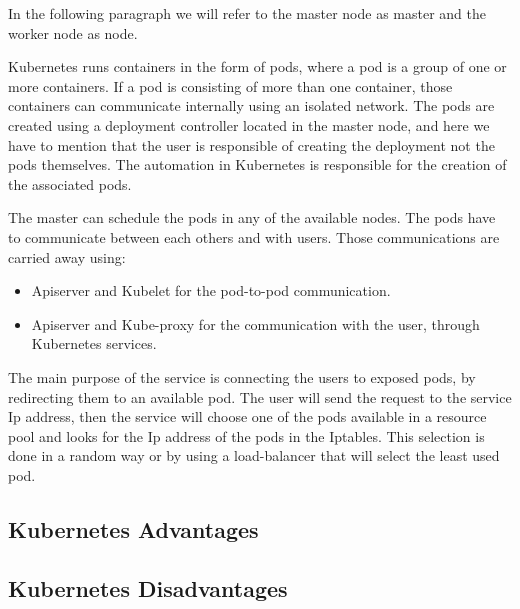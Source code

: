 \documentclass[letterpaper,twocolumn,10pt]{article}
\begin{document}
In the following paragraph we will refer to the master node as master and the worker node as node. 

Kubernetes runs containers in the form of pods, where a pod is a group of one or more containers. If a pod is consisting of more than one container, those containers can communicate internally using an isolated network. The pods are created using a deployment controller located in the master node, and here we have to mention that the user is responsible of creating the deployment not the pods themselves. The automation in Kubernetes is responsible for the creation of the associated pods.

The master can schedule the pods in any of the available nodes. The pods have to communicate between each others and with users. Those communications are carried away using: 

\begin{itemize}
	\item Apiserver and Kubelet for the pod-to-pod communication.
	\item Apiserver and Kube-proxy for the communication with the user, through Kubernetes services.
\end{itemize}

The main purpose of the service is connecting the users to exposed pods, by redirecting them to an available pod. The user will send the request to the service Ip address, then the service will choose one of the pods available in a resource pool and looks for the Ip address of the pods in the Iptables. This selection is done in a random way or by using a load-balancer that will select the least used pod.



\subsection{Kubernetes Advantages}





\subsection{Kubernetes Disadvantages}
\end{document}
